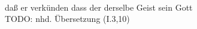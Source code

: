 \begin{exe}
\ex \label{ex:I1805} \gll {}          \\
{daß} {er} {verkünden} {dass} {der} {derselbe} {Geist} {sein} {Gott} {}\\
\glt TODO: nhd. Übersetzung (I.3,10)
\end{exe}
